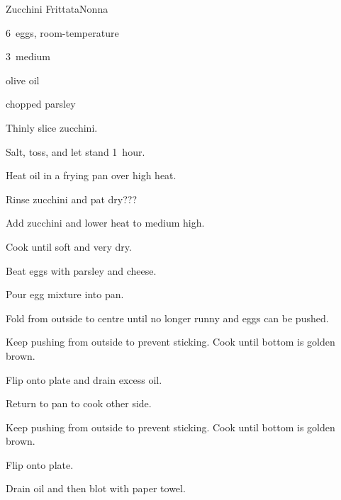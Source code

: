 \begin{recipe}{Zucchini Frittata\FIXME}{Nonna}{}

\begin{ingredients}
\item 6~eggs, room-temperature
\item 3~medium 
\item olive oil
\item chopped parsley
\item \C{\half} 
\end{ingredients}

\begin{directions}
\item Thinly slice zucchini.
\item Salt, toss, and let stand 1~hour.
\item Heat oil in a  frying pan over high heat.
\item Rinse zucchini and pat dry???
\item Add zucchini and lower heat to medium high.
\item Cook until soft and very dry.
\item Beat eggs with parsley and cheese.
\item Pour egg mixture into pan.
\item Fold from outside to centre until no longer runny and eggs can be pushed.
\item Keep pushing from outside to prevent sticking. Cook until bottom is golden brown.
\item Flip onto plate and drain excess oil.
\item Return to pan to cook other side.
\item Keep pushing from outside to prevent sticking. Cook until bottom is golden brown.
\item Flip onto plate.
\item Drain oil and then blot with paper towel.
\end{directions}

\end{recipe}
